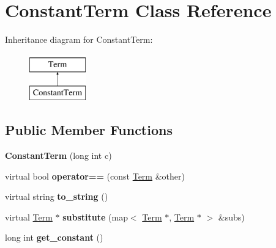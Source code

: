 \hypertarget{classConstantTerm}{\section{\-Constant\-Term \-Class \-Reference}
\label{classConstantTerm}
}
\-Inheritance diagram for \-Constant\-Term\-:\begin{figure}[H]
\begin{center}
\leavevmode
\includegraphics[height=2.000000cm]{classConstantTerm}
\end{center}
\end{figure}
\subsection*{\-Public \-Member \-Functions}
\begin{DoxyCompactItemize}
\item 
\hypertarget{classConstantTerm_abcdb55120fd16b9348a3a5b2f3a3c2fa}{{\bfseries \-Constant\-Term} (long int c)}\label{classConstantTerm_abcdb55120fd16b9348a3a5b2f3a3c2fa}

\item 
\hypertarget{classConstantTerm_ab7bd8a7f6ae006072ef51a2a9ec53bf0}{virtual bool {\bfseries operator==} (const \hyperlink{classTerm}{\-Term} \&other)}\label{classConstantTerm_ab7bd8a7f6ae006072ef51a2a9ec53bf0}

\item 
\hypertarget{classConstantTerm_ac720d945721c4d136a8bd8198fbf6f17}{virtual string {\bfseries to\-\_\-string} ()}\label{classConstantTerm_ac720d945721c4d136a8bd8198fbf6f17}

\item 
\hypertarget{classConstantTerm_a3fd40bae7e3822bf50fdd8f237a99bd7}{virtual \hyperlink{classTerm}{\-Term} $\ast$ {\bfseries substitute} (map$<$ \hyperlink{classTerm}{\-Term} $\ast$, \hyperlink{classTerm}{\-Term} $\ast$ $>$ \&subs)}\label{classConstantTerm_a3fd40bae7e3822bf50fdd8f237a99bd7}

\item 
\hypertarget{classConstantTerm_a541d6046999cccd83fdec132e09d2ee5}{long int {\bfseries get\-\_\-constant} ()}\label{classConstantTerm_a541d6046999cccd83fdec132e09d2ee5}

\end{DoxyCompactItemize}
